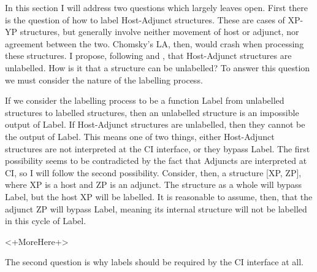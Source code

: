 \documentclass[MilwayThesis]{subfiles}
\begin{document}
In this section I will address two questions which \textcite{chomsky2013problems,chomsky2015problems} largely leaves open.
First there is the question of how to label Host-Adjunct structures.
These are cases of XP-YP structures, but generally involve neither movement of host or adjunct, nor agreement between the two.
Chomsky's LA, then, would crash when processing these structures.
I propose, following \textcite{hornstein2009theory} and \textcite{chametzky1996theory}, that Host-Adjunct structures are unlabelled.
How is it that a structure can be unlabelled?
To answer this question we must consider the nature of the labelling process. 

If we consider the labelling process to be a function Label from unlabelled structures to labelled structures, then an unlabelled structure is an impossible output of Label.
If Host-Adjunct structures are unlabelled, then they cannot be the output of Label.
This means one of two things, either Host-Adjunct structures are not interpreted at the CI interface, or they bypass Label.
The first possibility seems to be contradicted by the fact that Adjuncts are interpreted at CI, so I will follow the second possibility.
Consider, then, a structure [XP, ZP], where XP is a host and ZP is an adjunct.
The structure as a whole will bypass Label, but the host XP will be labelled.
It is reasonable to assume, then, that the adjunct ZP will bypass Label, meaning its internal structure will not be labelled in this cycle of Label.

<+MoreHere+>

The second question is why labels should be required by the CI interface at all. 
\end{document}
